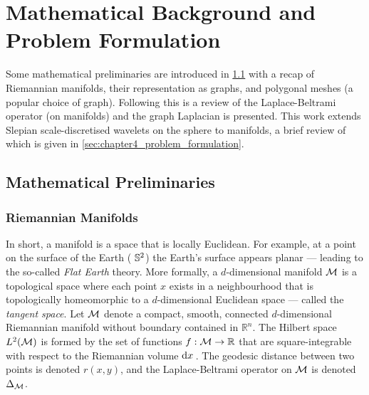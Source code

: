 \section{Mathematical Background and Problem Formulation}\label{sec:chapter4_mathematical_background_problem_formulation}

Some mathematical preliminaries are introduced in \cref{sec:chapter4_mathematical_preliminaries} with a recap of Riemannian manifolds, their representation as graphs, and polygonal meshes (a popular choice of graph).
Following this is a review of the Laplace-Beltrami operator (on manifolds) and the graph Laplacian is presented.
This work extends Slepian scale-discretised wavelets on the sphere to manifolds, a brief review of which is given in \cref{sec:chapter4_problem_formulation}.

\subsection{Mathematical Preliminaries}\label{sec:chapter4_mathematical_preliminaries}

\subsubsection{Riemannian Manifolds}

In short, a manifold is a space that is locally Euclidean.
For example, at a point on the surface of the Earth (\ie{} \(\mathbb{S}^{2}{}\)) the Earth's surface appears planar --- leading to the so-called \emph{Flat Earth} theory.
More formally, a \(d\)-dimensional manifold \(\mathcal{M}{}\) is a topological space where each point \(x\) exists in a neighbourhood that is topologically homeomorphic to a \(d\)-dimensional Euclidean space --- called the \emph{tangent space}.
Let \(\mathcal{M}{}\) denote a compact, smooth, connected \(d\)-dimensional Riemannian manifold without boundary contained in \(\mathbb{R}^{n}\).
The Hilbert space \(L^{2}(\mathcal{M})\) is formed by the set of functions \(f : \mathcal{M} \to \mathbb{R}\) that are square-integrable with respect to the Riemannian volume \(\dd{x}{}\).
The geodesic distance between two points is denoted \(r(x,y)\), and the Laplace-Beltrami operator on \(\mathcal{M}{}\) is denoted \(\Delta_{\mathcal{M}}\).

